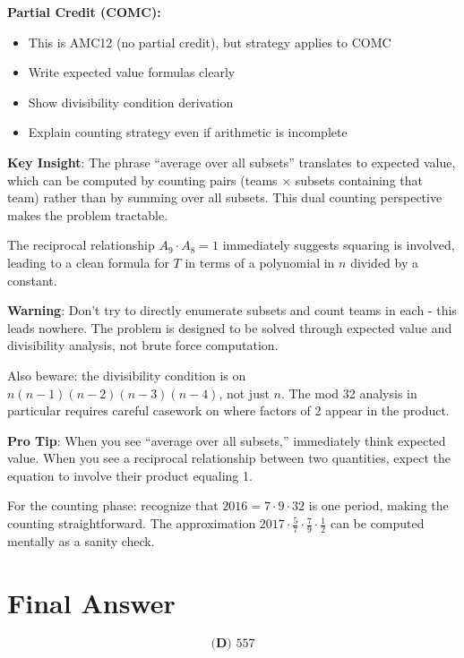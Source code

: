 \documentclass[]{article}
\begin{document}
\begin{competitionbox}
		\textbf{Partial Credit (COMC):}
		\begin{itemize}[nosep]
			\item This is AMC12 (no partial credit), but strategy applies to COMC
			\item Write expected value formulas clearly
			\item Show divisibility condition derivation
			\item Explain counting strategy even if arithmetic is incomplete
		\end{itemize}
	\end{competitionbox}
	
	\begin{keyinsightbox}
		\textbf{Key Insight}: The phrase ``average over all subsets'' translates to expected value, which can be computed by counting pairs (teams × subsets containing that team) rather than by summing over all subsets. This dual counting perspective makes the problem tractable.
		
		The reciprocal relationship $A_9 \cdot A_8 = 1$ immediately suggests squaring is involved, leading to a clean formula for $T$ in terms of a polynomial in $n$ divided by a constant.
	\end{keyinsightbox}
	
	\begin{warningbox}
		\textbf{Warning}: Don't try to directly enumerate subsets and count teams in each - this leads nowhere. The problem is designed to be solved through expected value and divisibility analysis, not brute force computation.
		
		Also beware: the divisibility condition is on $n(n-1)(n-2)(n-3)(n-4)$, not just $n$. The mod 32 analysis in particular requires careful casework on where factors of 2 appear in the product.
	\end{warningbox}
	
	\begin{tipbox}
		\textbf{Pro Tip}: When you see ``average over all subsets,'' immediately think expected value. When you see a reciprocal relationship between two quantities, expect the equation to involve their product equaling 1.
		
		For the counting phase: recognize that $2016 = 7 \cdot 9 \cdot 32$ is one period, making the counting straightforward. The approximation $2017 \cdot \frac{5}{7} \cdot \frac{7}{9} \cdot \frac{1}{2}$ can be computed mentally as a sanity check.
	\end{tipbox}
	
	\section*{Final Answer}
	\[\boxed{\textbf{(D) } 557}\]
	
\end{document}
